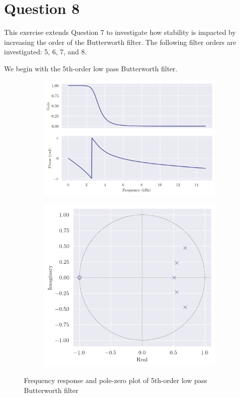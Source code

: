 \section*{Question 8}

This exercise extends Question 7 to investigate how stability is impacted by increasing the order of the Butterworth filter. The following filter orders are investigated: 5, 6, 7, and 8.

We begin with the 5th-order low pass Butterworth filter.

\begin{figure}[ht]
    \centering
    \begin{subfigure}[b]{0.58\textwidth}
        \centering
        \includegraphics[width=\textwidth]{images/q8_5th_freqz.png}
    \end{subfigure}
    \hfill
    \begin{subfigure}[b]{0.41\textwidth}
        \centering
        \includegraphics[width=\textwidth]{images/q8_5th_zp.png}
    \end{subfigure}
    \caption{Frequency response and pole-zero plot of 5th-order low pass Butterworth filter}
\end{figure}

